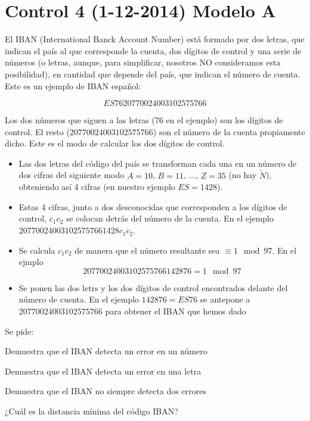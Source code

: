 \section{Control 4 (1-12-2014) Modelo A}
\begin{problem}[1]
El IBAN (International Banck Account Number) está formado por dos letras, que indican el país al que corresponde la cuenta, dos dígitos de control y una serie de números (o letras, aunque, para simplificar, nosotros NO consideramos esta posibilidad), en cantidad que depende del país, que indican el número de cuenta. Este es un ejemplo de IBAN español:

\[ES7620770024003102575766\]

Los dos números que siguen a las letras (76 en el ejemplo) son los dígitos de control. El resto ($20770024003102575766$) son el número de la cuenta propiamente dicho. Este es el modo de calcular los dos dígitos de control.

\begin{itemize}
\item Las dos letras del código del país se transforman cada una en un número de dos cifras del siguiente modo $A=10$, $B=11$, ..., $Z=35$ (no hay $\tilde{N}$), obteniendo así 4 cifras (en nuestro ejemplo $ES=1428$).

\item Estas 4 cifras, junto a dos desconocidas que corresponden a los dígitos de control, $c_1c_2$ se colocan detrás del número de la cuenta. En el ejemplo $207700240031025757661428c_1c_2$.

\item Se calcula $c_1c_2$ de manera que el número resultante sea $\equiv 1 \mod 97$. En el ejmplo
\[20770024003102575766142876=1 \mod 97\]

\item Se ponen las dos letrs y los dos dígitos de control encontrados delante del número de cuenta. En el ejemplo $142876=ES76$ se antepone a $20770024003102575766$ para obtener el IBAN que hemos dado
\end{itemize}

Se pide:

\ppart Demuestra que el IBAN detecta un error en un número

\ppart Demuestra que el IBAN detecta un error en una letra

\ppart Demuestra que el IBAN no siempre detecta dos errores

\ppart ¿Cuál es la distancia mínima del código IBAN?


\end{problem}
